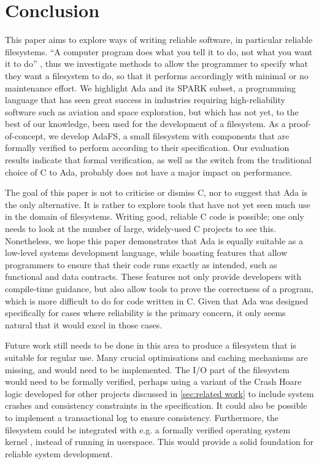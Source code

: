 \section{Conclusion}
This paper aims to explore ways of writing reliable software, in particular reliable filesystems.
``A computer program does what you tell it to do, not what you want it to do'' \cite{bloch1997}, thus we investigate methods to allow the programmer to specify what they want a filesystem to do, so that it performs accordingly with minimal or no maintenance effort.
We highlight Ada and its SPARK subset, a programming language that has seen great success in industries requiring high-reliability software such as aviation and space exploration, but which has not yet, to the best of our knowledge, been used for the development of a filesystem.
As a proof-of-concept, we develop AdaFS, a small filesystem with components that are formally verified to perform according to their specification.
Our evaluation results indicate that formal verification, as well as the switch from the traditional choice of C to Ada, probably does not have a major impact on performance.

The goal of this paper is not to criticise or dismiss C, nor to suggest that Ada is the only alternative.
It is rather to explore tools that have not yet seen much use in the domain of filesystems.
Writing good, reliable C code is possible; one only needs to look at the number of large, widely-used C projects to see this.
Nonetheless, we hope this paper demonstrates that Ada is equally suitable as a low-level systems development language, while boasting features that allow programmers to ensure that their code runs exactly as intended, such as functional and data contracts.
These features not only provide developers with compile-time guidance, but also allow tools to prove the correctness of a program, which is more difficult to do for code written in C.
Given that Ada was designed specifically for cases where reliability is the primary concern, it only seems natural that it would excel in those cases.

Future work still needs to be done in this area to produce a filesystem that is suitable for regular use.
Many crucial optimisations and caching mechanisms are missing, and would need to be implemented.
The I/O part of the filesystem would need to be formally verified, perhaps using a variant of the Crash Hoare logic developed for other projects discussed in \autoref{sec:related work} to include system crashes and consistency constraints in the specification.
It could also be possible to implement a transactional log to ensure consistency.
Furthermore, the filesystem could be integrated with e.g. a formally verified operating system kernel \cite{king2019}, instead of running in userspace.
This would provide a solid foundation for reliable system development.
